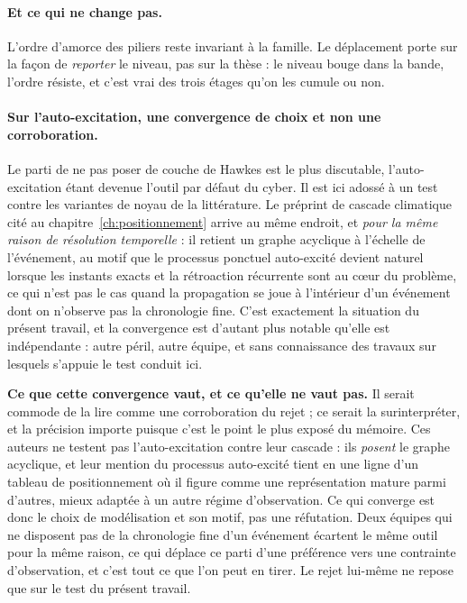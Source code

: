 \paragraph{Et ce qui ne change pas.} L'ordre d'amorce des piliers reste invariant à la
famille. Le déplacement porte sur la façon de \emph{reporter} le niveau, pas sur la thèse : le
niveau bouge dans la bande, l'ordre résiste, et c'est vrai des trois étages qu'on les cumule
ou non.

\paragraph{Sur l'auto-excitation, une convergence de choix et non une corroboration.} Le parti de
ne pas poser de couche de Hawkes est le plus discutable, l'auto-excitation étant
devenue l'outil par défaut du cyber. Il est ici adossé à un test contre les variantes de noyau de
la littérature. Le préprint de cascade climatique cité au chapitre~\ref{ch:positionnement}
\citep{ccrn2026} arrive au même endroit, et \emph{pour la même raison de résolution temporelle} :
il retient un graphe acyclique à l'échelle de l'événement, au motif que le processus ponctuel
auto-excité devient naturel lorsque les instants exacts et la rétroaction récurrente sont au
c\oe ur du problème, ce qui n'est pas le cas quand la propagation se joue à l'intérieur d'un
événement dont on n'observe pas la chronologie fine. C'est exactement la situation du présent
travail, et la convergence est d'autant plus notable qu'elle est indépendante : autre péril,
autre équipe, et sans connaissance des travaux sur lesquels s'appuie le test conduit ici.

\begin{attention}
\textbf{Ce que cette convergence vaut, et ce qu'elle ne vaut pas.} Il serait commode de la lire
comme une corroboration du rejet ; ce serait la surinterpréter, et la précision importe puisque
c'est le point le plus exposé du mémoire. Ces auteurs ne testent pas l'auto-excitation contre
leur cascade : ils \emph{posent} le graphe acyclique, et leur mention du processus auto-excité
tient en une ligne d'un tableau de positionnement où il figure comme une représentation mature
parmi d'autres, mieux adaptée à un autre régime d'observation. Ce qui converge est donc le
choix de modélisation et son motif, pas une réfutation. Deux équipes qui ne disposent
pas de la chronologie fine d'un événement écartent le même outil pour la même raison, ce qui
déplace ce parti d'une préférence vers une contrainte d'observation, et c'est tout ce que l'on
peut en tirer. Le rejet lui-même ne repose que sur le test du présent travail.
\end{attention}

